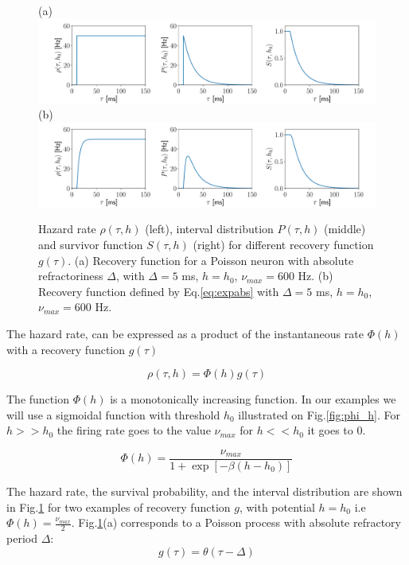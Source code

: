 \documentclass[12pt,twoside]{report}
\begin{document}
\begin{figure}[h!]
	(a) \\
	\includegraphics[width=\linewidth]{poissonRHOSP.pdf}
	(b)\\
	\includegraphics[width=\linewidth]{expRHOSP.pdf}
	\caption{Hazard rate $\rho(\tau,h)$ (left), interval distribution $P(\tau,h)$ (middle) and survivor function $S(\tau,h)$ (right) for different recovery function $g(\tau)$. (a) Recovery function for a Poisson neuron with absolute refractoriness $\Delta$, with $\Delta=5$ ms, $h=h_0$, $\nu_{max}=600$ Hz.  (b) Recovery function defined  by Eq.\eqref{eq:expabs} with $\Delta=5$ ms, $h=h_0$, $\nu_{max}=600$ Hz.  }
	\label{fig:renewalprocess}
\end{figure}

The hazard rate, can be expressed as a product of the instantaneous rate $\Phi(h)$ with a recovery function $g(\tau)$

\begin{equation}
\label{eq:rho}
\rho(\tau,h)=\Phi(h)g(\tau)
\end{equation}

The function $\Phi(h)$ is a monotonically increasing function. In our examples we will use a sigmoidal function with threshold $h_0$ illustrated on Fig.\ref{fig:phi_h}. For $h>>h_0$ the firing rate goes to the value $\nu_{max}$ for $h<<h_0$ it goes to $0$.

\begin{equation}
\label{eq:phi}
\Phi(h)=\frac{\nu_{max}}{1+\exp[-\beta(h-h_0)]}
\end{equation}


The hazard rate, the survival probability, and the interval distribution are shown in Fig.\ref{fig:renewalprocess} for two examples of recovery function $g$, with potential $h=h_0$ i.e $\Phi(h)=\frac{\nu_{max}}{2}$. Fig.\ref{fig:renewalprocess}(a) corresponds to a Poisson process with absolute refractory period $\Delta$: 
\begin{equation}
\label{eq:poissonabs}
g(\tau)=\theta(\tau-\Delta)
\end{equation}
\end{document}
